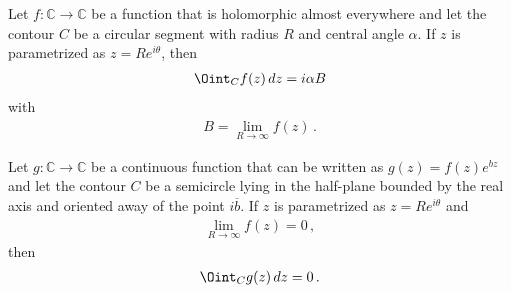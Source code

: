     \begin{theorem}\label{complex:great_limit}
        Let $f:\mathbb{C}\rightarrow\mathbb{C}$ be a function that is holomorphic almost everywhere and let the contour $C$ be a circular segment with radius $R$ and central angle $\alpha$. If $z$ is parametrized as $z=Re^{i\theta}$, then
        \begin{gather}
            \Oint_Cf(z)\,dz = i\alpha B
        \end{gather}
        with
        \begin{gather}
            B = \lim_{R\rightarrow\infty}f(z)\,.
        \end{gather}
    \end{theorem}

    \begin{theorem}\label{complex:jordan}
        Let $g:\mathbb{C}\rightarrow\mathbb{C}$ be a continuous function that can be written as $g(z) = f(z)e^{bz}$ and let the contour $C$ be a semicircle lying in the half-plane bounded by the real axis and oriented away of the point $i\overline{b}$. If $z$ is parametrized as $z=Re^{i\theta}$ and
        \begin{gather}
            \lim_{R\rightarrow\infty}f(z) = 0\,,
        \end{gather}
        then
        \begin{gather}
            \Oint_Cg(z)\,dz = 0\,.
        \end{gather}
    \end{theorem}